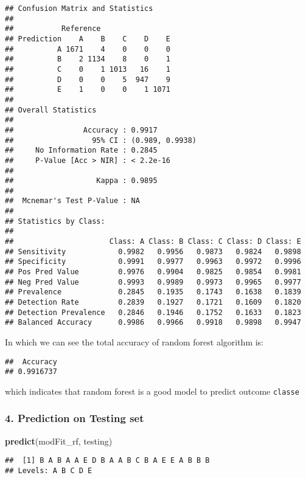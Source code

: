 \documentclass[
]{article}
\newenvironment{Shaded}{\begin{snugshade}}{\end{snugshade}}
\newcommand{\DecValTok}[1]{\textcolor[rgb]{0.00,0.00,0.81}{#1}}
\newcommand{\KeywordTok}[1]{\textcolor[rgb]{0.13,0.29,0.53}{\textbf{#1}}}
\newcommand{\NormalTok}[1]{#1}
\newcommand{\OperatorTok}[1]{\textcolor[rgb]{0.81,0.36,0.00}{\textbf{#1}}}
\begin{document}
\begin{verbatim}
## Confusion Matrix and Statistics
## 
##           Reference
## Prediction    A    B    C    D    E
##          A 1671    4    0    0    0
##          B    2 1134    8    0    1
##          C    0    1 1013   16    1
##          D    0    0    5  947    9
##          E    1    0    0    1 1071
## 
## Overall Statistics
##                                          
##                Accuracy : 0.9917         
##                  95% CI : (0.989, 0.9938)
##     No Information Rate : 0.2845         
##     P-Value [Acc > NIR] : < 2.2e-16      
##                                          
##                   Kappa : 0.9895         
##                                          
##  Mcnemar's Test P-Value : NA             
## 
## Statistics by Class:
## 
##                      Class: A Class: B Class: C Class: D Class: E
## Sensitivity            0.9982   0.9956   0.9873   0.9824   0.9898
## Specificity            0.9991   0.9977   0.9963   0.9972   0.9996
## Pos Pred Value         0.9976   0.9904   0.9825   0.9854   0.9981
## Neg Pred Value         0.9993   0.9989   0.9973   0.9965   0.9977
## Prevalence             0.2845   0.1935   0.1743   0.1638   0.1839
## Detection Rate         0.2839   0.1927   0.1721   0.1609   0.1820
## Detection Prevalence   0.2846   0.1946   0.1752   0.1633   0.1823
## Balanced Accuracy      0.9986   0.9966   0.9918   0.9898   0.9947
\end{verbatim}

In which we can see the total accuracy of random forest algorithm is:

\begin{Shaded}
\end{Shaded}

\begin{verbatim}
##  Accuracy 
## 0.9916737
\end{verbatim}

which indicates that random forest is a good model to predict outcome
\texttt{classe}

\hypertarget{prediction-on-testing-set}{%
\subsubsection{4. Prediction on Testing
set}\label{prediction-on-testing-set}}

\begin{Shaded}
\begin{Highlighting}[]
\KeywordTok{predict}\NormalTok{(modFit_rf, testing)}
\end{Highlighting}
\end{Shaded}

\begin{verbatim}
##  [1] B A B A A E D B A A B C B A E E A B B B
## Levels: A B C D E
\end{verbatim}
\end{document}

